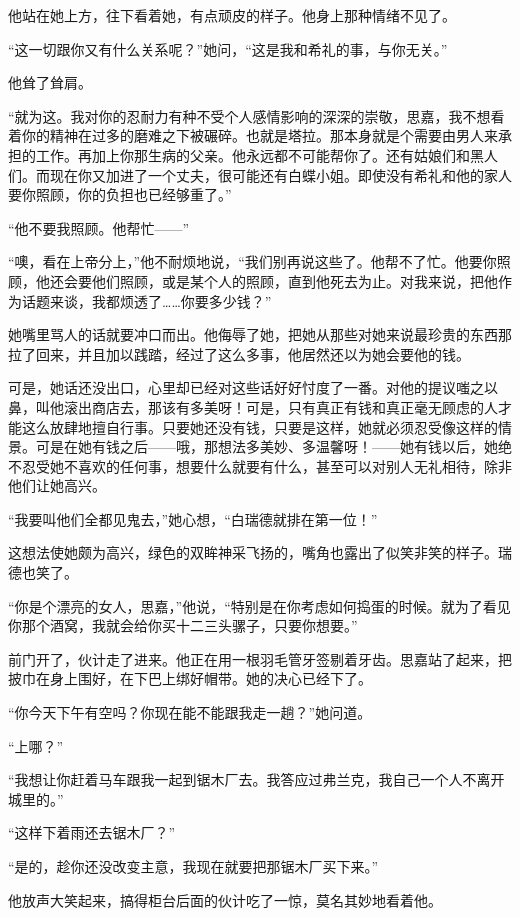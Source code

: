 \par 他站在她上方，往下看着她，有点顽皮的样子。他身上那种情绪不见了。
\par “这一切跟你又有什么关系呢？”她问，“这是我和希礼的事，与你无关。”
\par 他耸了耸肩。
\par “就为这。我对你的忍耐力有种不受个人感情影响的深深的崇敬，思嘉，我不想看着你的精神在过多的磨难之下被碾碎。也就是塔拉。那本身就是个需要由男人来承担的工作。再加上你那生病的父亲。他永远都不可能帮你了。还有姑娘们和黑人们。而现在你又加进了一个丈夫，很可能还有白蝶小姐。即使没有希礼和他的家人要你照顾，你的负担也已经够重了。”
\par “他不要我照顾。他帮忙——”
\par “噢，看在上帝分上，”他不耐烦地说，“我们别再说这些了。他帮不了忙。他要你照顾，他还会要他们照顾，或是某个人的照顾，直到他死去为止。对我来说，把他作为话题来谈，我都烦透了……你要多少钱？”
\par 她嘴里骂人的话就要冲口而出。他侮辱了她，把她从那些对她来说最珍贵的东西那拉了回来，并且加以践踏，经过了这么多事，他居然还以为她会要他的钱。
\par 可是，她话还没出口，心里却已经对这些话好好忖度了一番。对他的提议嗤之以鼻，叫他滚出商店去，那该有多美呀！可是，只有真正有钱和真正毫无顾虑的人才能这么放肆地擅自行事。只要她还没有钱，只要是这样，她就必须忍受像这样的情景。可是在她有钱之后——哦，那想法多美妙、多温馨呀！——她有钱以后，她绝不忍受她不喜欢的任何事，想要什么就要有什么，甚至可以对别人无礼相待，除非他们让她高兴。
\par “我要叫他们全都见鬼去，”她心想，“白瑞德就排在第一位！”
\par 这想法使她颇为高兴，绿色的双眸神采飞扬的，嘴角也露出了似笑非笑的样子。瑞德也笑了。
\par “你是个漂亮的女人，思嘉，”他说，“特别是在你考虑如何捣蛋的时候。就为了看见你那个酒窝，我就会给你买十二三头骡子，只要你想要。”
\par 前门开了，伙计走了进来。他正在用一根羽毛管牙签剔着牙齿。思嘉站了起来，把披巾在身上围好，在下巴上绑好帽带。她的决心已经下了。
\par “你今天下午有空吗？你现在能不能跟我走一趟？”她问道。
\par “上哪？”
\par “我想让你赶着马车跟我一起到锯木厂去。我答应过弗兰克，我自己一个人不离开城里的。”
\par “这样下着雨还去锯木厂？”
\par “是的，趁你还没改变主意，我现在就要把那锯木厂买下来。”
\par 他放声大笑起来，搞得柜台后面的伙计吃了一惊，莫名其妙地看着他。
